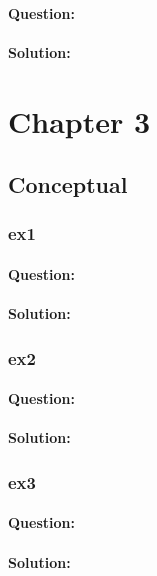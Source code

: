 \documentclass[a4paper,12pt,titlepage]{article} %
\begin{document}
\paragraph{Question:}

\paragraph{Solution:}


\newpage
\section{Chapter 3}
\subsection{Conceptual}
\subsubsection{ex1}
\paragraph{Question:}

\paragraph{Solution:}

\subsubsection{ex2}
\paragraph{Question:}

\paragraph{Solution:}

\subsubsection{ex3}
\paragraph{Question:}

\paragraph{Solution:}
\end{document}
